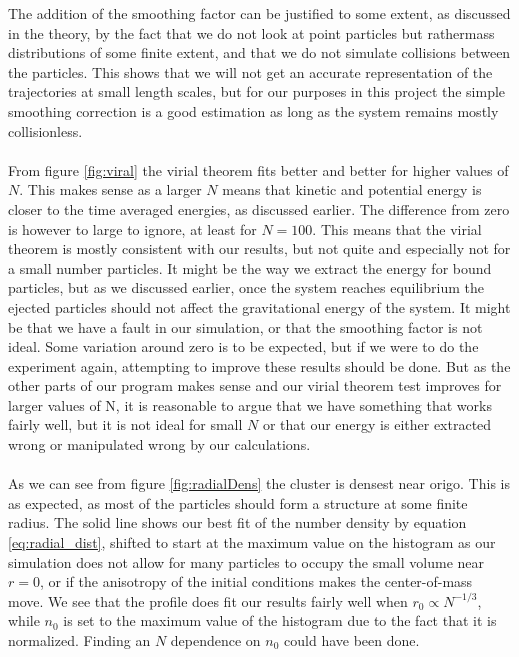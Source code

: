 \documentclass{article}
\begin{document}
The addition of the smoothing factor can be justified to some extent, as discussed in the theory, by the fact that we do not look at point particles but rathermass distributions of some finite extent, and that we do not simulate collisions between the particles. This shows that we will not get an accurate representation of the trajectories at small length scales, but for our purposes in this project the simple smoothing correction is a good estimation as long as the system remains mostly collisionless. \\ \\
From figure \ref{fig:viral} the virial theorem fits better and better for higher values of $N$. This makes sense as a larger $N$ means that kinetic and potential energy is closer to the time averaged energies, as discussed earlier. The difference from zero is however to large to ignore, at least for $N = 100$. This means that the virial theorem is mostly consistent with our results, but not quite and especially not for a small number particles. It might be the way we extract the energy for bound particles, but as we discussed earlier, once the system reaches equilibrium the ejected particles should not affect the gravitational energy of the system.  It might be that we have a fault in our simulation, or that the smoothing factor is not ideal. Some variation around zero is to be expected, but if we were to do the experiment again, attempting to improve these results should be done. But as the other parts of our program makes sense and our virial theorem test improves for larger values of N, it is reasonable to argue that we have something that works fairly well, but it is not ideal for small $N$ or that our energy is either extracted wrong or manipulated wrong by our calculations.
\\\\
As we can see from figure \ref{fig:radialDens} the cluster is densest near origo. This is as expected, as most of the particles should form a structure at some finite radius. The solid line shows our best fit of the number density by equation \eqref{eq:radial_dist}, shifted to start at the maximum value on the histogram as our simulation does not allow for many particles to occupy the small volume near $r=0$, or if the anisotropy of the initial conditions makes the center-of-mass move. We see that the profile does fit our results fairly well when $r_0 \propto N^{-1/3}$, while $n_0$ is set to the maximum value of the histogram due to the fact that it is normalized. Finding an $N$ dependence on $n_0$ could have been done.\\\\
\end{document}
